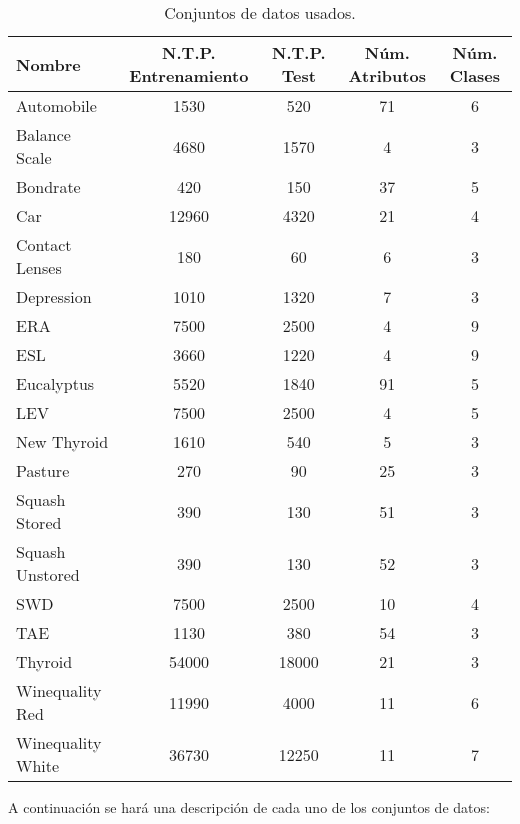 		\begin{table}[!h]
				\centering
				\begin{tabular}{l|c|c|c|c}
					\hline \textbf{Nombre} & \textbf{N.T.P. Entrenamiento} & \textbf{N.T.P. Test} & \textbf{Núm. Atributos} & \textbf{Núm. Clases} \\ 
					\hline Automobile & 1530 & 520 & 71 & 6 \\ 
					\hline Balance Scale & 4680 & 1570 & 4 & 3 \\ 
					\hline Bondrate & 420 & 150 & 37 & 5 \\ 
					\hline Car & 12960 & 4320 & 21 & 4 \\ 
					\hline Contact Lenses & 180 & 60 & 6 & 3 \\ 
					\hline Depression & 1010 & 1320 & 7 & 3 \\ 
					\hline ERA & 7500 & 2500 & 4 & 9 \\ 
					\hline ESL & 3660 & 1220 & 4 & 9 \\ 
					\hline Eucalyptus & 5520 & 1840 & 91 & 5 \\ 
					\hline LEV & 7500 & 2500 & 4 & 5 \\ 
					\hline New Thyroid & 1610 & 540 & 5 & 3 \\ 
					\hline Pasture & 270 & 90 & 25 & 3 \\ 
					\hline Squash Stored & 390 & 130 & 51 & 3 \\ 
					\hline Squash Unstored & 390 & 130 & 52 & 3 \\ 
					\hline SWD & 7500 & 2500 & 10 & 4 \\ 
					\hline TAE & 1130 & 380 & 54 & 3 \\ 
					\hline Thyroid & 54000 & 18000 & 21 & 3 \\ 
					\hline Winequality Red & 11990 & 4000 & 11 & 6 \\ 
					\hline Winequality White & 36730 & 12250 & 11 & 7 \\ 
					\hline 
				\end{tabular}
				\caption{Conjuntos de datos usados.}
				\label{tab:datasets}
			\end{table}
			
			A continuación se hará una descripción de cada uno de los conjuntos de datos:
			
